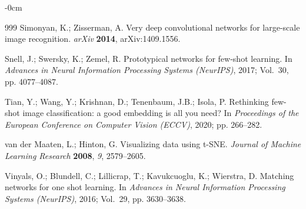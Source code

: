 \documentclass[preprint,12pt,authoryear]{elsarticle}
\begin{document}
\begin{adjustwidth}{-\extralength}{0cm}
\begin{thebibliography}{999}
Simonyan, K.; Zisserman, A.
\newblock Very deep convolutional networks for large-scale image recognition.
\newblock \emph{arXiv} \textbf{2014}, arXiv:1409.1556.

Snell, J.; Swersky, K.; Zemel, R.
\newblock Prototypical networks for few-shot learning.
\newblock In \emph{Advances in Neural Information Processing Systems (NeurIPS)},
  2017; Vol.~30, pp. 4077--4087.

Tian, Y.; Wang, Y.; Krishnan, D.; Tenenbaum, J.B.; Isola, P.
\newblock Rethinking few-shot image classification: a good embedding is all you
  need?
\newblock In \emph{Proceedings of the European Conference on Computer Vision
  (ECCV)}, 2020; pp. 266--282.

van der Maaten, L.; Hinton, G.
\newblock Visualizing data using t-SNE.
\newblock \emph{Journal of Machine Learning Research} \textbf{2008}, \emph{9},
  2579--2605.

Vinyals, O.; Blundell, C.; Lillicrap, T.; Kavukcuoglu, K.; Wierstra, D.
\newblock Matching networks for one shot learning.
\newblock In \emph{Advances in Neural Information Processing Systems (NeurIPS)},
  2016; Vol.~29, pp. 3630--3638.

\end{thebibliography}

\end{adjustwidth}
\end{document}
